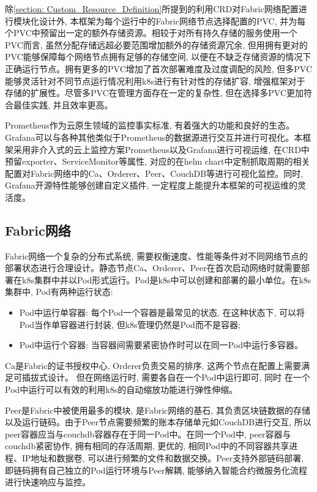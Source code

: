 除\ref{section: Custom_Resource_Definition}所提到的利用CRD对Fabric网络配置进行模块化设计外, 本框架为每个运行中的Fabric网络节点选择配置的PVC, 并为每个PVC中预留出一定的额外存储资源。相较于对所有持久存储的服务使用一个PVC而言, 虽然分配存储远超必要范围增加额外的存储资源冗余, 但用拥有更对的PVC能够保障每个网络节点拥有足够的存储空间, 以便在不缺乏存储资源的情况下正确运行节点。拥有更多的PVC增加了首次部署难度及过度调配的风险, 但多PVC能够灵活针对不同节点运行情况利用k8s进行有针对性的存储扩容, 增强框架对于存储的扩展性。尽管多PVC在管理方面存在一定的复杂性, 但在选择多PVC更加符合最佳实践, 并且效率更高\cite{d2020design}。

Prometheus\cite{sukhija2019towards}作为云原生领域的监控事实标准, 有着强大的功能和良好的生态。
Grafana可以与各种其他类似于Prometheus的数据源进行交互并进行可视化。本框架采用非介入式的云上监控方案Prometheus以及Grafana进行可视运维, 在CRD中预留exporter、ServiceMonitor等属性, 对应的在helm chart中定制抓取周期的相关配置对Fabric网络中的Ca、Orderer、Peer、CouchDB等进行可视化监控。同时, Grafana开源特性能够创建自定义插件, 一定程度上能提升本框架的可视运维的灵活度。


\subsection{Fabric网络}

Fabric网络一个复杂的分布式系统, 需要权衡速度、性能等条件对不同网络节点的部署状态进行合理设计。静态节点Ca、Orderer、Peer在首次启动网络时就需要部署在k8s集群中并以Pod形式运行。Pod是k8s中可以创建和部署的最小单位。在k8s集群中, Pod有两种运行状态:

\begin{itemize}[itemindent=2em]
    \item Pod中运行单容器: 每个Pod一个容器是最常见的状态, 在这种状态下, 可以将Pod当作单容器进行封装, 但k8s管理仍然是Pod而不是容器;

    \item Pod中运行个容器: 当容器间需要紧密协作时可以在同一Pod中运行多容器。
\end{itemize}

Ca是Fabric的证书授权中心, Orderer负责交易的排序, 这两个节点在配置上需要满足可插拔式设计。 但在网络运行时, 需要各自在一个Pod中运行即可, 同时 在一个Pod中运行可以有效的利用k8s的自动缩放功能进行弹性伸缩。

Peer是Fabric中被使用最多的模块, 是Fabric网络的基石, 其负责区块链数据的存储以及运行链码。由于Peer节点需要频繁的账本存储单元如CouchDB进行交互, 所以peer容器应当与couchdb容器存在于同一Pod中。在同一个Pod中, peer容器与couchdb紧密协作, 拥有相同的存活周期, 更优的, 相同Pod中的不同容器共享进程、IP地址和数据卷, 可以进行频繁的文件和数据交换。Peer支持外部链码部署, 即链码拥有自己独立的Pod运行环境与Peer解耦, 能够纳入智能合约微服务化流程\cite{zhangfuli2021smartcontract}进行快速响应与监控。 

